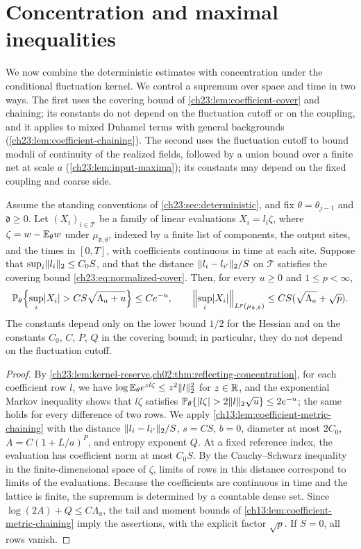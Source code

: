\section{Concentration and maximal inequalities}\label{ch23:sec:maxima}

We now combine the deterministic estimates with concentration under the conditional fluctuation kernel. We control a supremum over space and time in two ways. The first uses the covering bound of \cref{ch23:lem:coefficient-cover} and chaining; its constants do not depend on the fluctuation cutoff or on the coupling, and it applies to mixed Duhamel terms with general backgrounds (\cref{ch23:lem:coefficient-chaining}). The second uses the fluctuation cutoff to bound moduli of continuity of the realized fields, followed by a union bound over a finite net at scale $a$ (\cref{ch23:lem:input-maxima}); its constants may depend on the fixed coupling and coarse side.

\begin{lemma}\label{ch23:lem:coefficient-chaining}
Assume the standing conventions of \cref{ch23:sec:deterministic}, and fix $\theta=\theta_{j-1}$ and $\mathfrak d\ge0$. Let $(X_i)_{i\in\mathcal T}$ be a family of linear evaluations $X_i=l_i\zeta$, where $\zeta=w-\mathbb E_\theta w$ under $\mu_{\mathfrak d,\theta}$, indexed by a finite list of components, the output sites, and the times in $[0,T]$, with coefficients continuous in time at each site. Suppose that $\sup_i\lVert l_i\rVert_2\le C_0S$, and that the distance $\lVert l_i-l_{i'}\rVert_2/S$ on $\mathcal T$ satisfies the covering bound \eqref{ch23:eq:normalized-cover}. Then, for every $u\ge0$ and $1\le p<\infty$,
\[
 \mathbb P_\theta\Bigl\{\sup_i\lvert X_i\rvert>CS\sqrt{\Lambda_a+u}\Bigr\}\le Ce^{-u},
 \qquad
 \Bigl\|\sup_i\lvert X_i\rvert\Bigr\|_{L^p(\mu_{\mathfrak d,\theta})}\le CS(\sqrt{\Lambda_a}+\sqrt p).
\]
The constants depend only on the lower bound $1/2$ for the Hessian and on the constants $C_0$, $C$, $P$, $Q$ in the covering bound; in particular, they do not depend on the fluctuation cutoff.
\end{lemma}

\begin{proof}
By \cref{ch23:lem:kernel-reserve,ch02:thm:reflecting-concentration}, for each coefficient row $l$, we have $\log\mathbb E_\theta e^{zl\zeta}\le z^2\lVert l\rVert_2^2$ for $z\in\mathbb R$, and the exponential Markov inequality shows that $l\zeta$ satisfies $\mathbb P_\theta\{\lvert l\zeta\rvert>2\lVert l\rVert_2\sqrt u\}\le2e^{-u}$; the same holds for every difference of two rows. We apply \cref{ch13:lem:coefficient-metric-chaining} with the distance $\lVert l_i-l_{i'}\rVert_2/S$, $s=CS$, $b=0$, diameter at most $2C_0$, $A=C(1+L/a)^P$, and entropy exponent $Q$. At a fixed reference index, the evaluation has coefficient norm at most $C_0S$. By the Cauchy--Schwarz inequality in the finite-dimensional space of $\zeta$, limits of rows in this distance correspond to limits of the evaluations. Because the coefficients are continuous in time and the lattice is finite, the supremum is determined by a countable dense set. Since $\log(2A)+Q\le C\Lambda_a$, the tail and moment bounds of \cref{ch13:lem:coefficient-metric-chaining} imply the assertions, with the explicit factor $\sqrt p$. If $S=0$, all rows vanish.
\end{proof}


